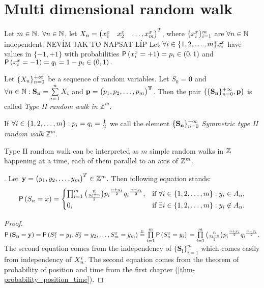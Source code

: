 \chapter{Multi dimensional random walk}
\renewcommand{\rw}{$\left( \{\mathbf{\mathbf{S_n}}\}_{n=0}^\pinf, \mathbf{p}\right)$}

\begin{defn}\label{defn-type_II}
  Let $m \in \mathbb{N}$. $\forall n \in \mathbb{N}$, let $X_n=\begin{pmatrix} \x[1] & \x[2]& \ldots, \x[m]\end{pmatrix}^T$, where $\{\x[i]\}_{i=1}^{m}$ are $\forall n \in \mathbb{N}$ independent.
  \ce NEVÍM JAK TO NAPSAT LÍP
  Let $\forall i \in \jm \x[i]$ have values in $\{-1,+1\}$ with probabilities $\pr \left(\x[i]=+1\right)=p_i \in \left(0,1\right)$ and $\pr \left(\x[i]=-1\right)=q_i=1-p_i \in  \left(0,1 \right).$

  Let $\{X_n\}_{n=0}^{+\infty}$ be a sequence of \iid random variables. Let $S_0=\mathbf{0}$ and $\forall n \in \N: \mathbf{S_n}=\suma X_i$ and $\bf{p}=\begin{pmatrix}
   p_1, p_2, \ldots, p_m
 \end{pmatrix}^T$. Then the pair $\left(\{\mathbf{S_n}\}_{n=0}^{+\infty}, \mathbf{p} \right)$ is called \emph{Type II random walk in $\mathbb{Z}^m$}.

  If $\forall i \in \{1,2,\ldots, m\}: p_i=q_i=\frac{1}{2}$ we call the \ce element $\{\mathbf{S_n}\}_{n=0}^{+\infty}$ \emph{Symmetric type II random walk $\mathbb{Z}^m$}.
\end{defn}
\begin{rem}
  Type II random walk can be interpreted as $m$ simple random walks in $\mathbb{Z}$ happening at a time, each of them parallel to an axis of $\mathbb{Z}^m$.
\end{rem}


\begin{thm}
  \Lrwm. Let $\mathbf{y}=\begin{pmatrix}
   y_1, y_2, \ldots, y_m
  \end{pmatrix}^T\in \mathbb{Z}^m.$ Then following equation stands:
  \[
  \operatorname{\textsf{P}} \left( S_n=x \right) =
  \begin{cases}
  \prod_{i=1}^{m}\binom{n}{\frac{y_i+n}{2}}{p_i}^{\frac{n+y_i}{2}}{q_i}^{\frac{n-y_i}{2}}, & \text{if $\forall i \in \{1,2,\ldots, m\}:y_i\in A_n$},\\
  0, & \text{if $\exists i \in \{1,2,\ldots, m\}:y_i\not\in A_n$}.
  \end{cases}
  \]

\end{thm}
\begin{proof}
  $\pr\left(\mathbf{S_n}=\mathbf{y}\right)
    =\pr\left( \s[1]=y_1, \s[2]=y_2, \ldots, \s[m]=y_m\right)
    \overset{\indep}{=}\prod\limits_{i=1}^{m}\pr\left(\s =y_i\right)\\
    =\prod\limits_{i=1}^{m}\binom{n}{\frac{y_i+n}{2}}{p_i}^{\frac{n+y_i}{2}}{q_i}^{\frac{n-y_i}{2}}.$ The second equation comes from the independency of $\{\mathbf{S_i}\}_{i=1}^m$ which comes easily from independency of $\indexx[i][n][X]$. The second equation comes from the theorem of probability of position and time from the first chapter (\ref {thm-probability_position_time}).
\end{proof}

